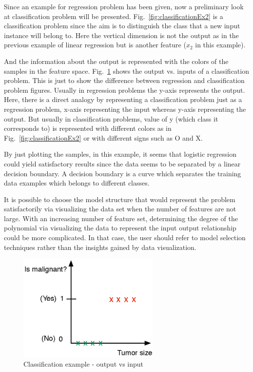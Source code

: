 Since an example for regression problem has been given, now a preliminary look at classification problem will be presented. 
Fig.~\ref{fig:classificationEx2} is a classification problem since the aim is to distinguish the class that a new input instance will belong to. 
Here the vertical dimension is not the output as in the previous example of linear regression but is another feature ($x_2$ in this example). 

And the information about the output is represented with the colors of the samples in the feature space.
Fig.~\ref{fig:classificationEx1} shows the output vs. inputs of a classification problem. 
This is just to show the difference between regression and classification problem figures. 
Usually in regression problems the y-axis represents the output. 
Here, there is a direct analogy by representing a classification problem just as a regression problem, x-axis representing the input whereas y-axis representing the output. 
But usually in classification problems, value of y (which class it corresponds to) is represented with different colors as in Fig.~\ref{fig:classificationEx2} or with different signs such as O and X.

By just plotting the samples, in this example, it seems that logistic regression could yield satisfactory results since the data seems to be separated by a linear decision boundary. 
A decision boundary is a curve which separates the training data examples which belongs to different classes. 

It is possible to choose the model structure that would represent the problem satisfactorily via visualizing the data set when the number of features are not large.
With an increasing number of feature set, determining the degree of the polynomial via visualizing the data to represent the input output relationship could be more complicated. 
In that case, the user should refer to model selection techniques rather than the insights gained by data visualization. 


\begin{figure}
\begin{center}
\includegraphics[width=7cm]{figures/classificationEx1}    %
\caption{Classification example - output vs input} 
\label{fig:classificationEx1}
\end{center}
\end{figure}

